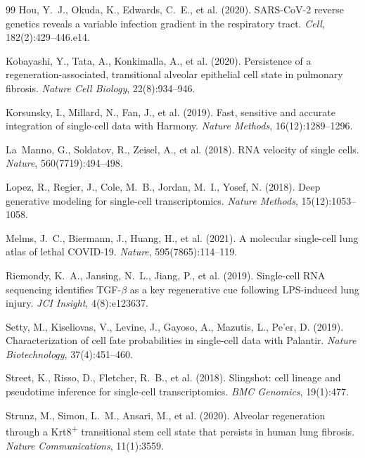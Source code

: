 \documentclass[11pt]{article}
\begin{document}
\begin{thebibliography}{99}
Hou, Y.~J., Okuda, K., Edwards, C.~E., et al. (2020).
SARS-CoV-2 reverse genetics reveals a variable infection gradient in the respiratory tract.
\textit{Cell}, 182(2):429--446.e14.

Kobayashi, Y., Tata, A., Konkimalla, A., et al. (2020).
Persistence of a regeneration-associated, transitional alveolar epithelial cell state in pulmonary fibrosis.
\textit{Nature Cell Biology}, 22(8):934--946.

Korsunsky, I., Millard, N., Fan, J., et al. (2019).
Fast, sensitive and accurate integration of single-cell data with Harmony.
\textit{Nature Methods}, 16(12):1289--1296.

La~Manno, G., Soldatov, R., Zeisel, A., et al. (2018).
RNA velocity of single cells.
\textit{Nature}, 560(7719):494--498.

Lopez, R., Regier, J., Cole, M.~B., Jordan, M.~I., Yosef, N. (2018).
Deep generative modeling for single-cell transcriptomics.
\textit{Nature Methods}, 15(12):1053--1058.

Melms, J.~C., Biermann, J., Huang, H., et al. (2021).
A molecular single-cell lung atlas of lethal COVID-19.
\textit{Nature}, 595(7865):114--119.

Riemondy, K.~A., Jansing, N.~L., Jiang, P., et al. (2019).
Single-cell RNA sequencing identifies TGF-$\beta$ as a key regenerative cue following LPS-induced lung injury.
\textit{JCI Insight}, 4(8):e123637.

Setty, M., Kiseliovas, V., Levine, J., Gayoso, A., Mazutis, L., Pe'er, D. (2019).
Characterization of cell fate probabilities in single-cell data with Palantir.
\textit{Nature Biotechnology}, 37(4):451--460.

Street, K., Risso, D., Fletcher, R.~B., et al. (2018).
Slingshot: cell lineage and pseudotime inference for single-cell transcriptomics.
\textit{BMC Genomics}, 19(1):477.

Strunz, M., Simon, L.~M., Ansari, M., et al. (2020).
Alveolar regeneration through a Krt8\textsuperscript{+} transitional stem cell state that persists in human lung fibrosis.
\textit{Nature Communications}, 11(1):3559.


\end{thebibliography}
\end{document}

